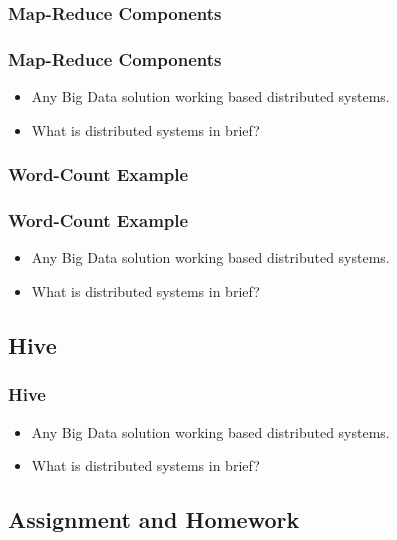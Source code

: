 
\subsubsection{Map-Reduce Components}
\begin{frame}
\frametitle{Map-Reduce Components}
\begin{itemize}[<+->]
	\item Any Big Data solution working based distributed systems.
	\item What is distributed systems in brief?
\end{itemize}
\end{frame}


\subsubsection{Word-Count Example}
\begin{frame}
\frametitle{Word-Count Example}
\begin{itemize}[<+->]
	\item Any Big Data solution working based distributed systems.
	\item What is distributed systems in brief?
\end{itemize}
\end{frame}


\subsection{Hive}
\begin{frame}
\frametitle{Hive}
\begin{itemize}[<+->]
	\item Any Big Data solution working based distributed systems.
	\item What is distributed systems in brief?
\end{itemize}
\end{frame}

\subsection{Assignment and Homework}